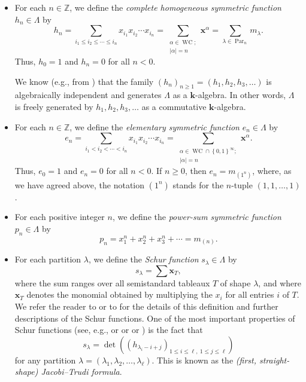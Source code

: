 \documentclass[numbers=enddot,12pt,final,onecolumn,notitlepage]{scrartcl}%
\theoremstyle{definition}
\let\sumnonlimits\sum
\renewcommand{\sum}{\sumnonlimits\limits}
\begin{document}
\begin{itemize}
\item For each $n\in\mathbb{Z}$, we define the \emph{complete homogeneous
symmetric function }$h_{n}\in\Lambda$ by%
\[
h_{n}=\sum_{i_{1}\leq i_{2}\leq\cdots\leq i_{n}}x_{i_{1}}x_{i_{2}}\cdots
x_{i_{n}}=\sum_{\substack{\alpha\in\operatorname*{WC};\\\left\vert
\alpha\right\vert =n}}\mathbf{x}^{\alpha}=\sum_{\lambda\in\operatorname*{Par}%
\nolimits_{n}}m_{\lambda}.
\]
Thus, $h_{0}=1$ and $h_{n}=0$ for all $n<0$.

We know (e.g., from \cite[Proposition 2.4.1]{GriRei}) that the family $\left(
h_{n}\right)  _{n\geq1}=\left(  h_{1},h_{2},h_{3},\ldots\right)  $ is
algebraically independent and generates $\Lambda$ as a $\mathbf{k}$-algebra.
In other words, $\Lambda$ is freely generated by $h_{1},h_{2},h_{3},\ldots$ as
a commutative $\mathbf{k}$-algebra.

\item For each $n\in\mathbb{Z}$, we define the \emph{elementary symmetric
function }$e_{n}\in\Lambda$ by%
\[
e_{n}=\sum_{i_{1}<i_{2}<\cdots<i_{n}}x_{i_{1}}x_{i_{2}}\cdots x_{i_{n}}%
=\sum_{\substack{\alpha\in\operatorname*{WC}\cap\left\{  0,1\right\}
^{\infty};\\\left\vert \alpha\right\vert =n}}\mathbf{x}^{\alpha}.
\]
Thus, $e_{0}=1$ and $e_{n}=0$ for all $n<0$. If $n\geq0$, then $e_{n}%
=m_{\left(  1^{n}\right)  }$, where, as we have agreed above, the notation
$\left(  1^{n}\right)  $ stands for the $n$-tuple $\left(  1,1,\ldots
,1\right)  $.

\item For each positive integer $n$, we define the \emph{power-sum symmetric
function} $p_{n}\in\Lambda$ by%
\[
p_{n}=x_{1}^{n}+x_{2}^{n}+x_{3}^{n}+\cdots=m_{\left(  n\right)  }.
\]


\item For each partition $\lambda$, we define the \emph{Schur function
}$s_{\lambda}\in\Lambda$ by%
\[
s_{\lambda}=\sum\mathbf{x}_{T},
\]
where the sum ranges over all semistandard tableaux $T$ of shape $\lambda$,
and where $\mathbf{x}_{T}$ denotes the monomial obtained by multiplying the
$x_{i}$ for all entries $i$ of $T$. We refer the reader to \cite[Definition
2.2.1]{GriRei} or to \cite[\S 7.10]{Stanley-EC2} for the details of this
definition and further descriptions of the Schur functions. One of the most
important properties of Schur functions (see, e.g., \cite[(2.4.16) for
$\mu=\varnothing$]{GriRei} or \cite[Theorem 2.32]{MenRem15} or \cite[Theorem
7.16.1 for $\mu=\varnothing$]{Stanley-EC2} or \cite[Theorem 7.2.3
(a)]{Sagan20}) is the fact that%
\begin{equation}
s_{\lambda}=\det\left(  \left(  h_{\lambda_{i}-i+j}\right)  _{1\leq i\leq
\ell,\ 1\leq j\leq\ell}\right)  \label{eq.schur.JTsh}%
\end{equation}
for any partition $\lambda=\left(  \lambda_{1},\lambda_{2},\ldots
,\lambda_{\ell}\right)  $. This is known as the \emph{(first, straight-shape)
Jacobi--Trudi formula}.


\end{itemize}
\end{document}
